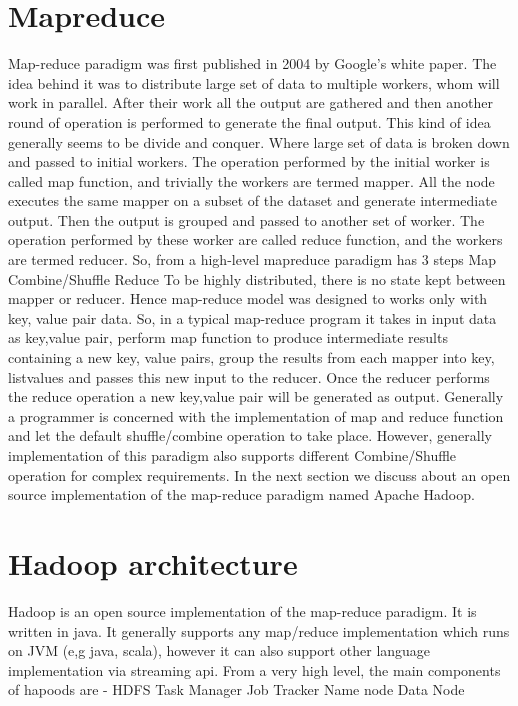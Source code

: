 \documentclass{article}
\begin{document}
\section{Mapreduce}
Map-reduce paradigm was first published in 2004 by Google’s white paper. The idea behind it was to distribute large set of data to multiple workers, whom will work in parallel. After their work all the output are gathered and then another round of operation is performed to generate the final output. This kind of idea generally seems to be divide and conquer. Where large set of data is broken down and passed to initial workers. The operation performed by the initial worker is called map function, and trivially the workers are termed mapper. All the node executes the same mapper on a subset of the dataset and generate intermediate output. Then the output is grouped and passed to another set of worker. The operation performed by these worker are called reduce function, and the workers are termed reducer. So, from a high-level mapreduce paradigm has 3 steps
Map
Combine/Shuffle
Reduce
To be highly distributed, there is no state kept between mapper or reducer. Hence map-reduce model was designed to works only with {key, value} pair data. So, in a typical map-reduce program it takes in input data as {key,value} pair, perform map function to produce intermediate results containing a new {key, value} pairs, group the results from each mapper into {key, list{values}} and passes this new input to the reducer. Once the reducer performs the reduce operation a new {key,value} pair will be generated as output. Generally a programmer is concerned with the implementation of map and reduce function and let the default shuffle/combine operation to take place. However, generally implementation of this paradigm also supports different Combine/Shuffle operation for complex requirements.
In the next section we discuss about an open source implementation of the map-reduce paradigm named Apache Hadoop.


\section{Hadoop architecture}
Hadoop is an open source implementation of the map-reduce paradigm. It is written in java. It generally supports any map/reduce implementation which runs on JVM (e,g java, scala), however it can also support other language implementation via streaming api. From a very high level, the main components of hapoods are -
HDFS
Task Manager
Job Tracker
Name node
Data Node
\end{document}
